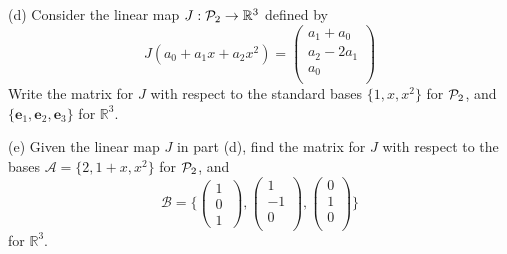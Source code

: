 \begin{question}
	\vspace{.4cm}	
		
\noindent (d) Consider the linear map $J:\P_2 \rightarrow \mathbb{R}^3$ defined by 
\[
J(a_0+a_1x+a_2x^2)= \left( \begin{array}{c}
a_1 + a_0\\
a_2-2a_1 \\
a_0 \\
 \end{array} \right)
 \]
\noindent Write the matrix for $J$ with respect to the standard bases $\{1,x,x^2\}$ for $\P_2$, and $\{\textbf{e}_1,\textbf{e}_2,\textbf{e}_3\}$ for $\mathbb{R}^3$.\\ 
 \vspace{0.5cm}

\noindent (e) Given the linear map $J$ in part (d), find the matrix for $J$ with respect to the bases $\mathcal{A} = \{2,1+x, x^2\}$ for $\P_2$, and 
\[
\mathcal{B} = \Bigg\{\left( \begin{array}{c}
1 \\
0 \\
1\
 \end{array}  \right), \left( \begin{array}{c}
1 \\
-1 \\
0\\
 \end{array} \right), \left( \begin{array}{c}
0 \\
1 \\
0\\
 \end{array} \right)\Bigg\} 
 \]
 for $\mathbb{R}^3.$

 
 
\end{question}

